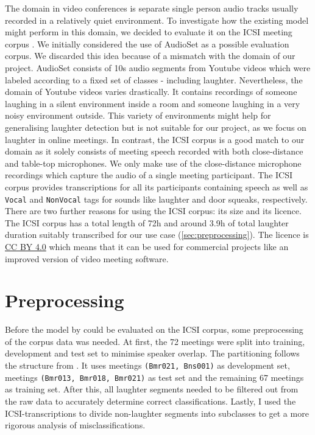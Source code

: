 \documentclass[bsc,frontabs,parskip,deptreport]{infthesis}
\begin{document}
The domain in video conferences is separate single person audio tracks usually recorded in a relatively quiet environment.
To investigate how the existing model might perform in this domain, we decided to evaluate it on the ICSI meeting corpus \citep{morgan2001meeting}. 
We initially considered the use of AudioSet \citep{googleaudioset} as a possible evaluation corpus. We discarded this idea because of a mismatch with the domain of our project. AudioSet  consists of 10s audio segments from Youtube videos which were labeled according to a fixed set of classes - including laughter. Nevertheless, the domain of Youtube videos varies drastically. It contains recordings of someone laughing in a silent environment inside a room and someone laughing in a very noisy environment outside. This variety of environments might help for generalising laughter detection but is not suitable for our project, as we focus on laughter in online meetings.
In contrast, the ICSI corpus is a good match to our domain as it solely consists of meeting speech recorded with both close-distance and table-top microphones. 
We only make use of the close-distance microphone recordings which capture the audio of a single meeting participant.
The ICSI corpus provides transcriptions for all its participants containing speech as well as \texttt{Vocal} and \texttt{NonVocal} tags for sounds like laughter and door squeaks, respectively.
There are two further reasons for using the ICSI corpus: its size and its licence.
The ICSI corpus has a total length of 72h and around 3.9h of total laughter duration suitably transcribed for our use case (\autoref{sec:preprocessing}).
The licence is \href{https://creativecommons.org/licenses/by/4.0/legalcode}{CC BY 4.0} which means that it can be used for commercial projects like an improved version of video meeting software. 


\section{Preprocessing} \label{sec:preprocessing}
Before the model by \citet{gillick2021robust} could be evaluated on the ICSI corpus, some preprocessing of the corpus data was needed.
At first, the 72 meetings were split into training, development and test set to minimise speaker overlap. The partitioning follows the structure from \citet{renals2014neural}. It uses meetings \texttt{(Bmr021, Bns001)} as development set, meetings \texttt{(Bmr013, Bmr018, Bmr021)} as test set and the remaining 67 meetings as training set.
After this, all laughter segments needed to be filtered out from the raw data to accurately determine correct classifications. 
Lastly, I used the ICSI-transcriptions to divide non-laughter segments into subclasses to get a more rigorous analysis of misclassifications.
\end{document}
